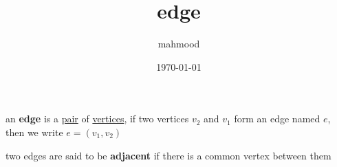 \documentclass[a4paper,12pt]{article}
\author{mahmood}
\date{\today}
\title{edge}
\begin{document}
\maketitle
\begin{definition}
an \textbf{edge} is a \href{discrete_maths2.org}{pair} of \href{20230314001051-graph.org}{vertices}, if two vertices \(v_2\) and \(v_1\) form an edge named \(e\), then we write \(e=(v_1,v_2)\)\\
\begin{characteristic}
two edges are said to be \textbf{adjacent} if there is a common vertex between them\\
\end{characteristic}
\end{definition}
\end{document}
